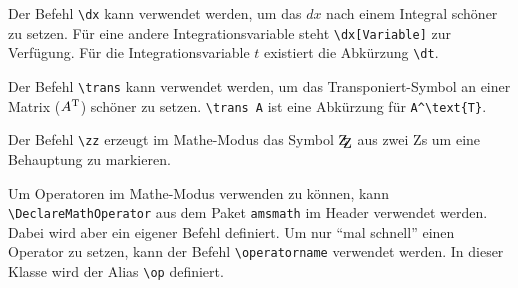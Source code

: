 \documentclass{exercise}
\begin{document}
    Der Befehl \lstinline-\dx- kann verwendet werden, um das $dx$ nach einem Integral schöner zu setzen. Für eine andere Integrationsvariable steht \lstinline-\dx[Variable]- zur Verfügung. Für die Integrationsvariable $t$ existiert die Abkürzung \lstinline-\dt-.
    
    Der Befehl \lstinline-\trans- kann verwendet werden, um das Transponiert-Symbol an einer Matrix (${A}^\text{T}$) schöner zu setzen. \lstinline-\trans A- ist eine Abkürzung für \lstinline-A^\text{T}-.
    
    Der Befehl \lstinline-\zz- erzeugt im Mathe-Modus das
    Symbol $\zz{}$ aus zwei Zs um eine Behauptung zu markieren.
    
    Um Operatoren im Mathe-Modus verwenden zu können, kann \lstinline-\DeclareMathOperator-
    aus dem Paket \texttt{amsmath} \cite{amsmath} im Header verwendet werden.
    Dabei wird aber ein eigener Befehl definiert.
    Um nur \enquote{mal schnell}
    einen Operator zu setzen, kann der Befehl \lstinline-\operatorname- verwendet werden.
    In dieser Klasse wird der Alias \lstinline-\op- definiert.
    
\end{document}
